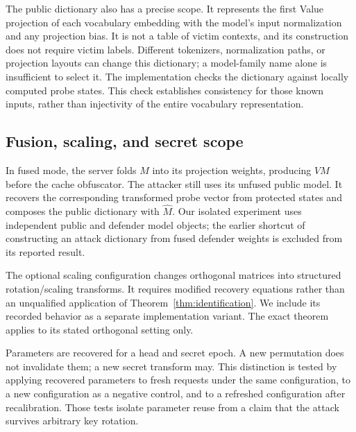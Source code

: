 The public dictionary also has a precise scope. It represents the first Value projection of each vocabulary embedding with the model's input normalization and any projection bias. It is not a table of victim contexts, and its construction does not require victim labels. Different tokenizers, normalization paths, or projection layouts can change this dictionary; a model-family name alone is insufficient to select it. The implementation checks the dictionary against locally computed probe states. This check establishes consistency for those known inputs, rather than injectivity of the entire vocabulary representation.

\subsection{Fusion, scaling, and secret scope}
In fused mode, the server folds $M$ into its projection weights, producing $VM$ before the cache obfuscator. The attacker still uses its unfused public model. It recovers the corresponding transformed probe vector from protected states and composes the public dictionary with $\widehat M$. Our isolated experiment uses independent public and defender model objects; the earlier shortcut of constructing an attack dictionary from fused defender weights is excluded from its reported result.

The optional scaling configuration changes orthogonal matrices into structured rotation/scaling transforms. It requires modified recovery equations rather than an unqualified application of Theorem~\ref{thm:identification}. We include its recorded behavior as a separate implementation variant. The exact theorem applies to its stated orthogonal setting only.

Parameters are recovered for a head and secret epoch. A new permutation does not invalidate them; a new secret transform may. This distinction is tested by applying recovered parameters to fresh requests under the same configuration, to a new configuration as a negative control, and to a refreshed configuration after recalibration. Those tests isolate parameter reuse from a claim that the attack survives arbitrary key rotation.
